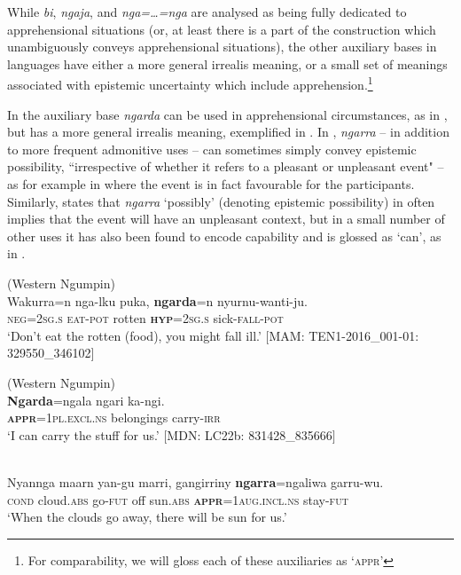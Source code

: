 \documentclass[output=paper,colorlinks,citecolor=brown]{langscibook}
\begin{document}

While  \textit{bi},  \textit{ngaja}, and  \textit{nga=\ldots=nga} are analysed as being fully dedicated to apprehensional situations (or, at least there is a part of the construction which unambiguously conveys apprehensional situations), the other auxiliary bases in  languages have either a more general irrealis meaning, or a small set of meanings associated with epistemic uncertainty which include apprehension.\footnote{For comparability, we will gloss each of these auxiliaries as \textsc{`appr'}}

In  the auxiliary base \textit{ngarda} can be used in apprehensional circumstances, as in , but has a more general irrealis meaning, exemplified in . In  \citep[643]{senge_grammar_2015}, \textit{ngarra} -- in addition to more frequent admonitive uses -- can sometimes simply convey epistemic possibility, ``irrespective of whether it refers to a pleasant or unpleasant event" -- as for example in  where the event is in fact favourable for the participants. Similarly, \citet[204]{tsunoda_djaru_1981} states that \textit{ngarra} `possibly' (denoting epistemic possibility) in  often implies that the event will have an unpleasant context, but in a small number of other uses it has also been found to encode capability and is glossed as `can', as in .

\ea 
\textnormal{ (Western Ngumpin)} \\
\gll Wakurra=n nga-lku puka, \textbf{ngarda}=n nyurnu-wanti-ju. \\
\textsc{neg=2sg.s} \textsc{eat-pot} rotten \textsc{\textbf{hyp}=2sg.s} sick-\textsc{fall-pot} \\
\glt `Don't eat the rotten (food), you might fall ill.' $[$MAM: TEN1-2016\_001-01: 329550\_346102$]$
\label{ex:bro62}
\z


\ea 
\textnormal{ (Western Ngumpin)} \\
\gll \textbf{Ngarda}=ngala ngari ka-ngi. \\
\textsc{\textbf{appr}=1pl.excl.ns} belongings carry-\textsc{irr} \\
\glt `I can carry the stuff for us.' $[$MDN: LC22b: 831428\_835666$]$
\label{ex:bro63}
\z

\ea
{} \\
\gll Nyannga maarn yan-gu marri, gangirriny \textbf{ngarra}=ngaliwa garru-wu. \\
\textsc{cond} cloud.\textsc{abs} go-\textsc{fut} off sun.\textsc{abs} \textsc{\textbf{appr}=1aug.incl.ns} stay-\textsc{fut} \\
\glt `When the clouds go away, there will be sun for us.' 
\label{ex:bro64}
\z
\end{document}
